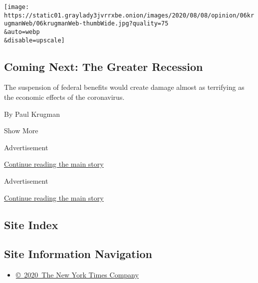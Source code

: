 \begin{enumerate}
  \texttt{[image: https://static01.graylady3jvrrxbe.onion/images/2020/08/08/opinion/06krugmanWeb/06krugmanWeb-thumbWide.jpg?quality=75\\\&auto=webp\\\&disable=upscale]}

  \hypertarget{coming-next-the-greater-recession}{%
  \subsection{Coming Next: The Greater
  Recession}\label{coming-next-the-greater-recession}}

  The suspension of federal benefits would create damage almost as
  terrifying as the economic effects of the coronavirus.

  By Paul Krugman
\end{enumerate}

Show More

Advertisement

\protect\hyperlink{after-mid1}{Continue reading the main story}

Advertisement

\protect\hyperlink{after-mktg}{Continue reading the main story}

\hypertarget{site-index}{%
\subsection{Site Index}\label{site-index}}

\hypertarget{site-information-navigation}{%
\subsection{Site Information
Navigation}\label{site-information-navigation}}

\begin{itemize}
\tightlist
\item
  \href{https://help.nytimes3xbfgragh.onion/hc/en-us/articles/115014792127-Copyright-notice}{©~2020~The
  New York Times Company}
\end{itemize}

